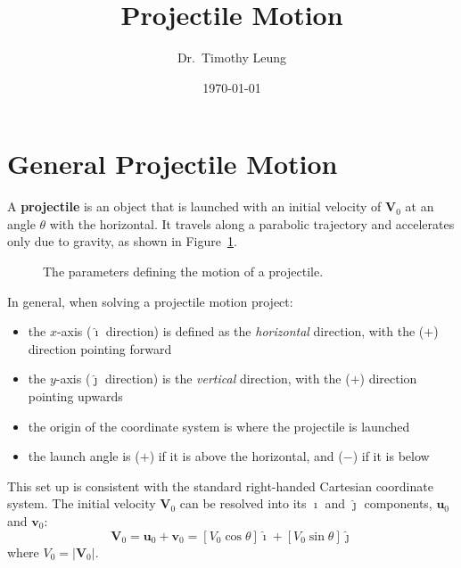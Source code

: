 \documentclass{../../oss-handout}
\title{Projectile Motion}
\author{Dr.\ Timothy Leung}
\date{\today}
\newcommand{\mb}[1]{\mathbf{#1}}
\newcommand{\iii}{\hat{\bm{\imath}}}
\newcommand{\jjj}{\hat{\bm{\jmath}}}
\begin{document}
\thispagestyle{title}
\gentitle

\section{General Projectile Motion}
A \textbf{projectile} is an object that is launched with an initial velocity
of $\mb V_0$ at an angle $\theta$ with the horizontal. It travels along a
parabolic trajectory and accelerates only due to gravity, as shown in
Figure~\ref{fig:projectile}. 
\begin{figure}[ht]
  \centering
  \caption{The parameters defining the motion of a projectile.}
  \label{fig:projectile}
\end{figure}

In general, when solving a projectile motion project:
\begin{itemize}[nosep]
\item the $x$-axis ($\iii$ direction) is defined as the \emph{horizontal}
  direction, with the ($+$) direction pointing forward
\item the $y$-axis ($\jjj$ direction) is the \emph{vertical} direction, with
  the ($+$) direction pointing upwards
\item the origin of the coordinate system is where the projectile is launched
\item the launch angle is ($+$) if it is above the horizontal, and ($-$) if it
  is below
\end{itemize}
This set up is consistent with the standard right-handed Cartesian coordinate
system. The initial velocity $\mb V_0$ can be resolved into its $\iii$ and
$\jjj$ components, $\mb u_0$ and $\mb v_0$:
\begin{equation}
  \mb V_0 =\mb u_0+\mb v_0
  =\left[V_0\cos\theta\right]\iii + \left[V_0\sin\theta\right]\jjj
\end{equation}
where $V_0=|\mb V_0|$.
\end{document}
